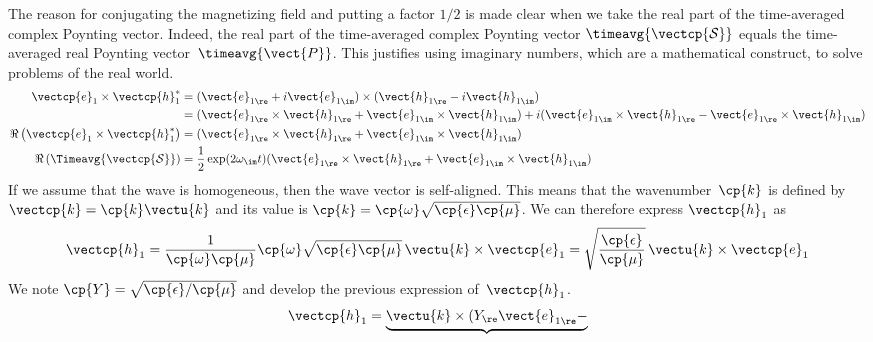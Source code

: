 \begin{refsection}
The reason for conjugating the magnetizing field and putting a factor $1/2$ is made clear when we take the real part of the time-averaged complex Poynting vector.
Indeed, the real part of the time-averaged complex Poynting vector $\timeavg{\vectcp{\mathcal{S}}}$ equals the time-averaged real Poynting vector~$\timeavg{\vect{P}}$.
This justifies using imaginary numbers, which are a mathematical construct, to solve problems of the real world.
\begin{subequations}
    \begin{align}
        \vectcp{e}_1 \times \vectcp{h}_1^*
        &=
        ( \vect{e}_{1\re} + i \vect{e}_{1\im} )
        \times
        ( \vect{h}_{1\re} - i \vect{h}_{1\im} )
        \\
        &=
        (
            \vect{e}_{1\re} \times \vect{h}_{1\re}
            +
            \vect{e}_{1\im} \times \vect{h}_{1\im}
        )
        +
        i
        (
            \vect{e}_{1\im} \times \vect{h}_{1\re}
            -
            \vect{e}_{1\re} \times \vect{h}_{1\im}
        )
        \\
        \Re\left( \vectcp{e}_1 \times \vectcp{h}_1^* \right)
        &=
        (
            \vect{e}_{1\re} \times \vect{h}_{1\re}
            +
            \vect{e}_{1\im} \times \vect{h}_{1\im}
        )
        \\
        \Re\left( \Timeavg{\vectcp{\mathcal{S}}} \right)
        &=
        \frac{1}{2}
        \exp(2\omega_\im t)
        (
            \vect{e}_{1\re} \times \vect{h}_{1\re}
            +
            \vect{e}_{1\im} \times \vect{h}_{1\im}
        )
    \end{align}
\end{subequations}
If we assume that the wave is homogeneous, then the wave vector is self-aligned.
This means that the wavenumber~$\cp{k}$ is defined by $\vectcp{k} = \cp{k} \vectu{k}$ and its value is $\cp{k}=\cp{\omega} \sqrt{\cp{\epsilon} \cp{\mu}}$.
We can therefore express $\vectcp{h}_1$ as
\begin{equation}
    \vectcp{h}_1
    =
    \frac{1}{\cp{\omega} \cp{\mu}}
    \cp{\omega} \sqrt{\cp{\epsilon} \cp{\mu}} \, \vectu{k} \times \vectcp{e}_1
    =
    \sqrt{\frac{\cp{\epsilon}}{\cp{\mu}}} \, \vectu{k} \times \vectcp{e}_1
\end{equation}
We note $\cp{Y}=\sqrt{\cp{\epsilon}/\cp{\mu}}$ and develop the previous expression of~$\vectcp{h}_1$.
\begin{equation}
    \vectcp{h}_1
    =
    \underbrace{\vectu{k} \times
                (Y_\re \vect{e}_{1\re} -
}
\end{equation}
\end{refsection}
